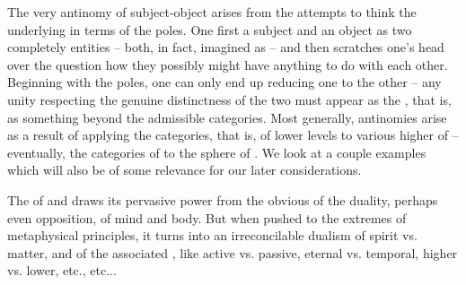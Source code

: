 The very antinomy of subject-object arises from the attempts to think the
underlying  in terms of the  poles. One
first  a subject and an object as two completely 
entities -- both, in fact, imagined as  -- and then scratches one's
head over the question how they possibly might have anything to do with each
other. Beginning with the  poles, one can only end up
reducing one to the other -- any unity respecting the genuine distinctness of
the two must appear as  the , that is, as
something  beyond the admissible categories.  Most generally,
antinomies arise as a result of applying the categories, that is,
 of lower levels to various higher  of
 -- eventually, the categories of  to the sphere
of . We look at a couple examples which will also be of some
relevance for our later considerations.

\label{pa:matter}
%
%
The  of  and  draws its pervasive power
from the obvious  of the duality, perhaps even opposition, of
mind and body. But when pushed to the extremes of metaphysical principles, it
turns into an irreconcilable dualism of spirit vs. matter, and of the associated
, like active vs. passive, eternal vs. temporal, higher vs.
lower, etc., etc...

